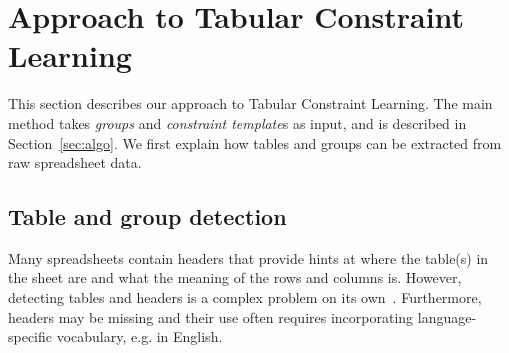 \documentclass{sig-alternate-05-2015}
\newcommand{\constraints}{\ensuremath{\mathcal{T}}\xspace}
\newcommand{\format}[1]{\textit{#1}\xspace}
\newcommand{\template}{\format{constraint template}}
\newcommand{\dependencies}{\ensuremath{\mathcal{D}}\xspace}
\newcommand{\groups}{\ensuremath{\mathcal{G}}\xspace}
\begin{document}


\newcommand{\tcl}{Tabular Constraint Learning}
\section{Approach to Tabular Constraint Learning}\label{sec:approach}
This section describes our approach to \tcl. The main method takes \textit{groups} and {\template}s as input, and is described in Section~\ref{sec:algo}. We first explain how tables and groups can be extracted from raw spreadsheet data.

\subsection{Table and group detection} \label{sec:make_groups}
Many spreadsheets contain headers that provide hints at where the table(s) in the sheet are and what the meaning of the rows and columns is. However, detecting tables and headers is a complex problem on its own~\cite{header}. Furthermore, headers may be missing and their use often requires incorporating language-specific vocabulary, e.g. in English.
\end{document}

